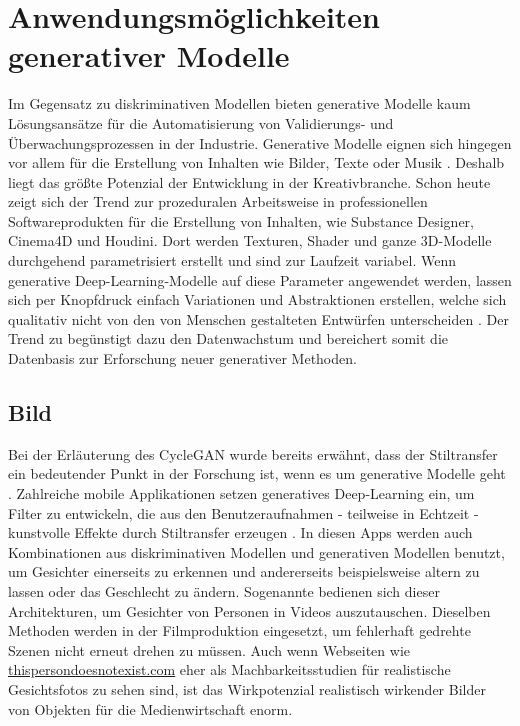 \section{Anwendungsmöglichkeiten generativer Modelle}\label{Anwendungsmöglichkeiten generativer Modelle}

Im Gegensatz zu diskriminativen Modellen bieten generative Modelle kaum Lösungsansätze für die Automatisierung von Validierungs- und Überwachungsprozessen in der Industrie. Generative Modelle eignen sich hingegen vor allem für die Erstellung von Inhalten wie Bilder, Texte oder Musik \cite[S.7]{fos19}.
Deshalb liegt das größte Potenzial der Entwicklung in der Kreativbranche. Schon heute zeigt sich der Trend zur prozeduralen Arbeitsweise in professionellen Softwareprodukten für die Erstellung von Inhalten, wie Substance Designer, Cinema4D und Houdini. Dort werden Texturen, Shader und ganze 3D-Modelle durchgehend parametrisiert erstellt und sind zur Laufzeit variabel. Wenn generative Deep-Learning-Modelle auf diese Parameter angewendet werden, lassen sich per Knopfdruck einfach Variationen und Abstraktionen erstellen, welche sich qualitativ nicht von den von Menschen gestalteten Entwürfen unterscheiden \cite{bcon18}. Der Trend zu  begünstigt dazu den Datenwachstum und bereichert somit die Datenbasis zur Erforschung neuer generativer Methoden.

\subsection{Bild}
Bei der Erläuterung des CycleGAN wurde bereits erwähnt, dass der Stiltransfer ein bedeutender Punkt in der Forschung ist, wenn es um generative Modelle geht \cite{san18}. Zahlreiche mobile Applikationen setzen generatives Deep-Learning ein, um Filter zu entwickeln, die aus den Benutzeraufnahmen - teilweise in Echtzeit - kunstvolle Effekte durch Stiltransfer erzeugen \cite{hua17}. In diesen Apps werden auch Kombinationen aus diskriminativen Modellen und generativen Modellen benutzt, um Gesichter einerseits zu erkennen und andererseits beispielsweise altern zu lassen oder das Geschlecht zu ändern. Sogenannte  bedienen sich dieser Architekturen, um Gesichter von Personen in Videos auszutauschen. Dieselben Methoden werden in der Filmproduktion eingesetzt, um fehlerhaft gedrehte Szenen nicht erneut drehen zu müssen. Auch wenn Webseiten wie \href{https://thispersondoesnotexist.com}{thispersondoesnotexist.com} eher als Machbarkeitsstudien für realistische Gesichtsfotos zu sehen sind, ist das Wirkpotenzial realistisch wirkender Bilder von Objekten für die Medienwirtschaft enorm.

